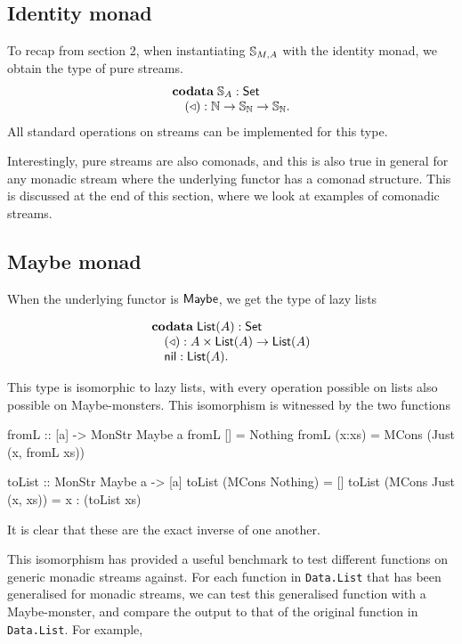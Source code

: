 \documentclass{article}
\begin{document}
\subsection{Identity monad}

To recap from section 2, when instantiating $\mathbb{S}_{M,A}$ with the identity monad, we obtain the type of pure streams.
$$
\begin{array}[t]{l}
\mathbf{codata}\;
\mathbb{S}_{A}:\mathsf{Set}\\
\quad (\triangleleft): \mathbb{N}\rightarrow \mathbb{S}_{\mathbb{N}} \rightarrow\mathbb{S}_{\mathbb{N}}.
\end{array}
$$
All standard operations on streams can be implemented for this type.

Interestingly, pure streams are also comonads, and this is also true in general for any monadic stream where the underlying functor has a comonad structure. This is discussed at the end of this section, where we look at examples of comonadic streams.

\subsection{Maybe monad}

When the underlying functor is $\mathsf{Maybe}$, we get the type of lazy lists

$$
\begin{array}[t]{l}
\mathbf{codata}\;
\mathsf{List}(A):\mathsf{Set}\\
\quad (\triangleleft): A\times \mathsf{List}(A)\rightarrow\mathsf{List}(A)\\
\quad \mathsf{nil}: \mathsf{List}(A).
\end{array}
$$

This type is isomorphic to lazy lists, with every operation possible on lists also possible on Maybe-monsters. This isomorphism is witnessed by the two functions

\begin{haskell}
fromL :: [a] -> MonStr Maybe a
fromL [] = Nothing
fromL (x:xs) = MCons (Just (x, fromL xs))

toList :: MonStr Maybe a -> [a]
toList (MCons Nothing) = []
toList (MCons Just (x, xs)) = x : (toList xs)
\end{haskell} 

It is clear that these are the exact inverse of one another. 

This isomorphism has provided a useful benchmark to test different functions on generic monadic streams against. For each function in \verb+Data.List+ that has been generalised for monadic streams, we can test this generalised function with a Maybe-monster, and compare the output to that of the original function in \verb+Data.List+. For example, 
\end{document}
